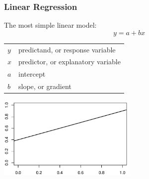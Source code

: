 \documentclass[xcolor=table, xcolor=dvipsnames]{beamer}\usepackage[]{graphicx}\usepackage[]{color}
\begin{document}
% 


\begin{frame}[fragile]\frametitle{Linear Regression}
  The most simple linear model:
  \[
  y=a+bx
  \]
  \begin{center}
  \begin{tabular}{ll}
  $y$ & predictand, or response variable\\
  $x$ & predictor, or explanatory variable\\
  $a$ & intercept\\
  $b$ & slope, or gradient\\
  \end{tabular}
\includegraphics[width=0.5\textwidth]{./externalfig/linear_regression.pdf}
\end{center}
\end{frame}

\end{document}
